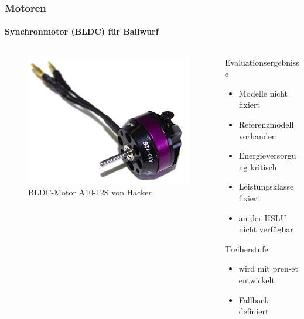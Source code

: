 \begin{frame}
	\frametitle{Motoren \hfill{} \footnotesize \group}
	\framesubtitle{Synchronmotor (BLDC) für Ballwurf}
	\begin{columns}
		\begin{column}{0.5\textwidth}
			\begin{figure}
				\centering
				\includegraphics[width=1\textwidth]{../../fig/motor/bldc_02.png}
				\caption{BLDC-Motor A10-12S von Hacker}
			\end{figure}
		\end{column}
		\begin{column}{0.5\textwidth}
			\begin{block}{Evaluationsergebnisse}
				\begin{itemize}
					\item Modelle nicht fixiert
					\item Referenzmodell vorhanden
					\item Energieversorgung kritisch
					\item Leistungsklasse fixiert
					\item an der HSLU nicht verfügbar
				\end{itemize}
			\end{block}
			\begin{exampleblock}{Treiberstufe}
				\begin{itemize}
					\item wird mit pren-et entwickelt
					\item Fallback definiert
				\end{itemize}
			\end{exampleblock}
		\end{column}
	\end{columns}
\end{frame}


